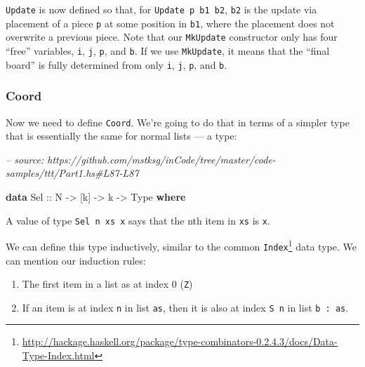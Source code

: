 \documentclass[]{article}
\newenvironment{Shaded}{}{}
\newcommand{\CommentTok}[1]{\textcolor[rgb]{0.38,0.63,0.69}{\textit{#1}}}
\newcommand{\DataTypeTok}[1]{\textcolor[rgb]{0.56,0.13,0.00}{#1}}
\newcommand{\KeywordTok}[1]{\textcolor[rgb]{0.00,0.44,0.13}{\textbf{#1}}}
\newcommand{\NormalTok}[1]{#1}
\newcommand{\OtherTok}[1]{\textcolor[rgb]{0.00,0.44,0.13}{#1}}
\renewcommand{\href}[2]{#2\footnote{\url{#1}}}
\begin{document}
\texttt{Update} is now defined so that, for \texttt{Update\ p\ b1\ b2},
\texttt{b2} is the update via placement of a piece \texttt{p} at some position
in \texttt{b1}, where the placement does not overwrite a previous piece. Note
that our \texttt{MkUpdate} constructor only has four ``free'' variables,
\texttt{i}, \texttt{j}, \texttt{p}, and \texttt{b}. If we use \texttt{MkUpdate},
it means that the ``final board'' is fully determined from only \texttt{i},
\texttt{j}, \texttt{p}, and \texttt{b}.

\hypertarget{coord}{%
\subsubsection{Coord}\label{coord}}

Now we need to define \texttt{Coord}. We're going to do that in terms of a
simpler type that is essentially the same for normal lists --- a type:

\begin{Shaded}
\begin{Highlighting}[]
\CommentTok{-- source: https://github.com/mstksg/inCode/tree/master/code-samples/ttt/Part1.hs#L87-L87}

\KeywordTok{data} \DataTypeTok{Sel}\OtherTok{ ::} \DataTypeTok{N} \OtherTok{->}\NormalTok{ [k] }\OtherTok{->}\NormalTok{ k }\OtherTok{->} \DataTypeTok{Type} \KeywordTok{where}
\end{Highlighting}
\end{Shaded}

A value of type \texttt{Sel\ n\ xs\ x} says that the nth item in \texttt{xs} is
\texttt{x}.

We can define this type inductively, similar to the common
\href{http://hackage.haskell.org/package/type-combinators-0.2.4.3/docs/Data-Type-Index.html}{\texttt{Index}}
data type. We can mention our induction rules:

\begin{enumerate}
\def\labelenumi{\arabic{enumi}.}
\tightlist
\item
  The first item in a list as at index 0 (\texttt{Z})
\item
  If an item is at index \texttt{n} in list \texttt{as}, then it is also at
  index \texttt{S\ n} in list \texttt{b\ \textquotesingle{}:\ as}.
\end{enumerate}
\end{document}
